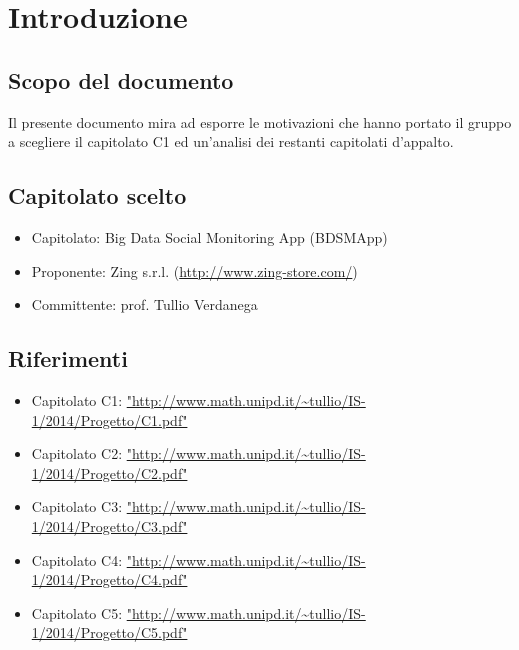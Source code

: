 %


\section{Introduzione}

\subsection{Scopo del documento}
Il presente documento mira ad esporre le motivazioni che hanno portato il gruppo a scegliere il capitolato C1 ed un'analisi dei restanti capitolati d'appalto.

\subsection{Capitolato scelto}
\begin{itemize}
\item Capitolato: Big Data Social Monitoring App (BDSMApp)
\item Proponente: Zing s.r.l. (\url{http://www.zing-store.com/})
\item Committente: prof. Tullio Verdanega
\end{itemize}

\subsection{Riferimenti}
\begin{itemize}
\item Capitolato C1: \url{"http://www.math.unipd.it/~tullio/IS-1/2014/Progetto/C1.pdf"}
\item Capitolato C2: \url{"http://www.math.unipd.it/~tullio/IS-1/2014/Progetto/C2.pdf"}
\item Capitolato C3: \url{"http://www.math.unipd.it/~tullio/IS-1/2014/Progetto/C3.pdf"}
\item Capitolato C4: \url{"http://www.math.unipd.it/~tullio/IS-1/2014/Progetto/C4.pdf"}
\item Capitolato C5: \url{"http://www.math.unipd.it/~tullio/IS-1/2014/Progetto/C5.pdf"}
\end{itemize}